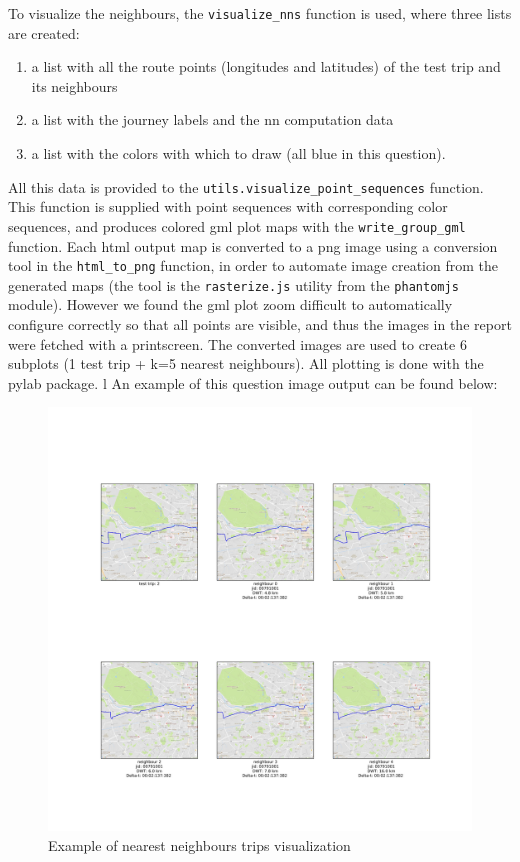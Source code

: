 \documentclass[12pt]{article}
\begin{document}
	
  To visualize the neighbours, the \texttt{visualize\_nns}
  function is used, where three lists are created:
  \begin{enumerate}
    \item a list with all the route points (longitudes and latitudes) of the
      test trip and its neighbours
    \item a list with the journey labels and the nn computation data
      \item a list with the colors with which to draw (all blue in this
        question).
      \end{enumerate}
      All this data is provided to the
      \texttt{utils.visualize\_point\_sequences} function. This function is
      supplied with point sequences with corresponding color sequences, and
      produces colored gml plot maps with the \texttt{write\_group\_gml}
      function. Each html output map is converted to a png image using a conversion tool in the \texttt{html\_to\_png} function, in
order to automate image creation from the generated maps (the tool is the
\texttt{rasterize.js} utility from the \texttt{phantomjs} module).
However we found the gml plot zoom difficult to automatically configure correctly so that
all points are visible, and thus the images in the report were fetched with a printscreen.
The converted images are used to create 6 subplots (1 test trip + k=5 nearest
neighbours). All plotting is done with the pylab package.
l 
	An example of this question image output can be found below:
	
	\begin{figure} [H]
		\begin{center}
			\includegraphics [scale = 0.40] {question2a1example.jpg}
			\caption{Example of nearest neighbours trips visualization}
		\end{center}
	\end{figure} 
	
\end{document}
